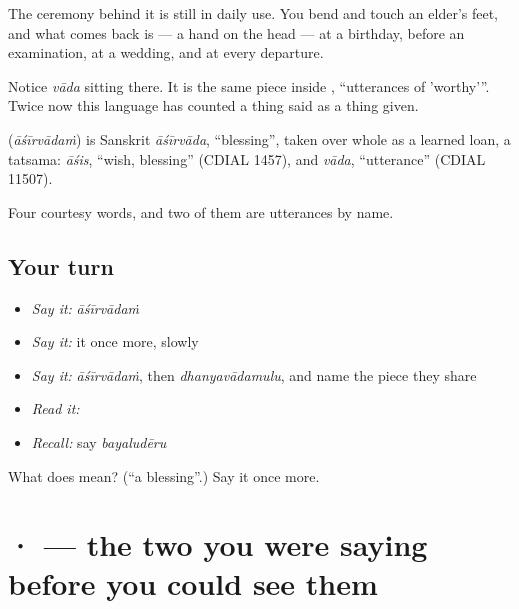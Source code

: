 The ceremony behind it is still in daily use. You bend and touch an elder's feet, and what comes back is  --- a hand on the head --- at a birthday, before an examination, at a wedding, and at every departure.

Notice \emph{vāda} sitting there. It is the same piece inside , \textquotedblleft{}utterances of 'worthy'\textquotedblright{}. Twice now this language has counted a thing said as a thing given.

\begin{cousinweb}
\textbf{} (\emph{āśīrvādaṁ}) is Sanskrit \emph{āśīrvāda}, \textquotedblleft{}blessing\textquotedblright{}, taken over whole as a learned loan, a tatsama: \emph{āśis}, \textquotedblleft{}wish, blessing\textquotedblright{} (CDIAL 1457), and \emph{vāda}, \textquotedblleft{}utterance\textquotedblright{} (CDIAL 11507).
\end{cousinweb}

\begin{grammarlens}[title={What you've built}]
Four courtesy words, and two of them are utterances by name.
\end{grammarlens}

\subsection*{Your turn}
\begin{itemize}
\raggedright
  \item \emph{Say it:} \emph{āśīrvādaṁ}
  \item \emph{Say it:} it once more, slowly
  \item \emph{Say it:} \emph{āśīrvādaṁ}, then \emph{dhanyavādamulu}, and name the piece they share
  \item \emph{Read it:} \textbf{}
  \item \emph{Recall:} say \emph{bayaludēru}
\end{itemize}

\begin{tcolorbox}[breakable,colback=teal!4,colframe=teal!35!black,title={Before you move on}]
What does  mean? (\textquotedblleft{}a blessing\textquotedblright{}.) Say it once more.
\end{tcolorbox}
\section[\texorpdfstring{\te{ఞ} · \te{◌ౌ} (ña · au)}{ఞ · ◌ౌ (ña · au)}]{ ·  — the two you were saying before you could see them}

